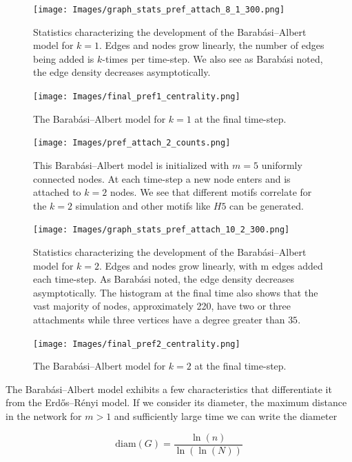 \begin{figure}[h!]
    \texttt{[image: Images/graph\_stats\_pref\_attach\_8\_1\_300.png]}
    \centering
    \caption{Statistics characterizing the development of the Barabási–Albert model for $k=1$.
    Edges and nodes grow linearly, the number of edges being added is $k$-times per time-step. We also 
    see as Barabási noted, the edge density decreases asymptotically.}
\end{figure}


\begin{figure}
    \texttt{[image: Images/final\_pref1\_centrality.png]}
    \centering
    \caption{The Barabási–Albert model for $k=1$ at the final time-step.}
\end{figure}

\begin{figure}[h!]
    \texttt{[image: Images/pref\_attach\_2\_counts.png]}
    \centering
    \caption{This Barabási–Albert model is initialized with $m=5$ uniformly connected nodes.
    At each time-step a new node enters and is attached to $k=2$ nodes. We see that different motifs
    correlate for the $k=2$ simulation and other motifs like $H5$ can be generated.}
    \label{fig:BA2}
\end{figure}

\begin{figure}[h!]
    \texttt{[image: Images/graph\_stats\_pref\_attach\_10\_2\_300.png]}
    \centering
    \caption{Statistics characterizing the development of the Barabási–Albert model for $k=2$.
    Edges and nodes grow linearly, with m edges added each time-step. As Barabási noted, the edge density decreases asymptotically. The histogram at
    the final time also shows that the vast majority of nodes, approximately 220, have two or three attachments
    while three vertices have a degree greater than $35$.}
\end{figure}

\begin{figure}
    \texttt{[image: Images/final\_pref2\_centrality.png]}
    \centering
    \caption{The Barabási–Albert model for $k=2$ at the final time-step.}
\end{figure}

The Barabási–Albert model exhibits a few characteristics that differentiate it from the 
Erdős–Rényi model. If we consider its diameter, the maximum distance in the network
for $m>1$ and sufficiently large time we can write the diameter 

$$\text{diam}(G) = \frac{\ln(n)}{\ln(\ln (N))}$$

